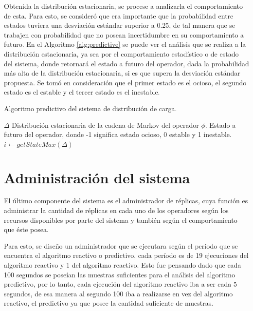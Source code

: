Obtenida la distribución estacionaria, se procese a analizarla el comportamiento de esta. Para esto, se consideró que era importante que la probabilidad entre estados tuviera una desviación estándar superior a 0.25, de tal manera que se trabajen con probabilidad que no posean incertidumbre en su comportamiento a futuro. En el Algoritmo \ref{alg:predictive} se puede ver el análisis que se realiza a la distribución estacionaria, ya sea por el comportamiento estadístico o de estado del sistema, donde retornará el estado a futuro del operador, dada la probabilidad más alta de la distribución estacionaria, si es que supera la desviación estándar propuesta. Se tomó en consideración que el primer estado es el ocioso, el segundo estado es el estable y el tercer estado es el inestable.

\begin{algorithm}[!ht]
	\caption{Algoritmo predictivo del sistema de distribución de carga.}
	\label{alg:predictive}
	\begin{algorithmic}[1]
	\REQUIRE$\Delta$ Distribución estacionaria de la cadena de Markov del operador $\phi$.
	\ENSURE Estado a futuro del operador, donde -1 significa estado ocioso, 0 estable y 1 inestable.
		\STATE $i \leftarrow getStateMax(\Delta)$ 
		\ELSE
		\ENDIF
	\ENDIF
	
	
	\end{algorithmic}
\end{algorithm}

\section{Administración del sistema}

El último componente del sistema es el administrador de réplicas, cuya función es administrar la cantidad de réplicas en cada uno de los operadores según los recursos disponibles por parte del sistema y también según el comportamiento que éste posea.

Para esto, se diseño un administrador que se ejecutara según el período que se encuentra el algoritmo reactivo o predictivo, cada período es de 19 ejecuciones del algoritmo reactivo y 1 del algoritmo reactivo. Esto fue pensando dado que cada 100 segundos se poseían las muestras suficientes para el análisis del algoritmo predictivo, por lo tanto, cada ejecución del algoritmo reactivo iba a ser cada 5 segundos, de esa manera al segundo 100 iba a realizarse en vez del algoritmo reactivo, el predictivo ya que posee la cantidad suficiente de muestras.

